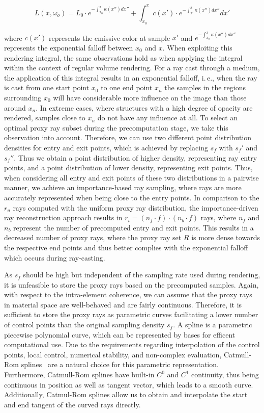 \documentclass[review,journal]{vgtc}         %
\begin{document}
$$ L(x,\omega_o) = L_0 \cdot e^{-\int_{x_0}^{x}\kappa(x'')dx''} + \int_{x_0}^{x}  \! c(x') \cdot e^{-\int_{x'}^{x}\kappa(x'')dx''} dx'$$

\noindent where $c(x')$ represents the emissive color at sample $x'$ and $e^{-\int_{x_0}^{x}\kappa(x'')dx''}$ represents the exponential falloff between $x_0$ and $x$. When exploiting this rendering integral, the same observations hold as when applying the integral within the context of regular volume rendering. For a ray cast through a medium, the application of this integral results in an exponential falloff, i.\,e., when the ray is cast from one start point $x_0$ to one end point $x_n$ the samples in the regions surrounding $x_0$ will have considerable more influence on the image than those around $x_n$. In extreme cases, where structures with a high degree of opacity are rendered, samples close to $x_n$ do not have any influence at all. To select an optimal proxy ray subset during the precomputation stage, we take this observation into account. Therefore, we can use two different point distribution densities for entry and exit points, which is achieved by replacing $s_f$ with $s_f'$ and $s_f''$. Thus we obtain a point distribution of higher density, representing ray entry points, and a point distribution of lower density, representing exit points. Thus, when considering all entry and exit points of these two distributions in a pairwise manner, we achieve an importance-based ray sampling, where rays are more accurately represented when being close to the entry points. In comparison to the $r_u$ rays computed with the uniform proxy ray distribution, the importance-driven ray reconstruction approach results in $r_i = (n_{f} \cdot f) \cdot (n_{b} \cdot f)$ rays, where $n_{f}$ and $n_{b}$ represent the number of precomputed entry and exit points. This results in a decreased number of proxy rays, where the proxy ray set $R$ is more dense towards the respective end points and thus better complies with the exponential falloff which occurs during ray-casting.

As $s_f$ should be high but independent of the sampling rate used during rendering, it is unfeasible to store the proxy rays based on the precomputed samples. Again, with respect to the intra-element coherence, we can assume that the proxy rays in material space are well-behaved and are fairly continuous. Therefore, it is sufficient to store the proxy rays as parametric curves facilitating a lower number of control points than the original sampling density $s_f$. A spline is a parametric piecewise polynomial curve, which can be represented by bases for efficent computational use. Due to the requirements regarding interpolation of the control points, local control, numerical stability, and non-complex evaluation, Catmull-Rom splines~\cite{catmull74splines} are a natural choice for this parametric representation. Furthermore, Catmull-Rom splines have built-in $C^{0}$ and $C^{1}$ continuity, thus being continuous in position as well as tangent vector, which leads to a smooth curve. Additionally, Catmul-Rom splines allow us to obtain and interpolate the start and end tangent of the curved rays directly.
\end{document}
